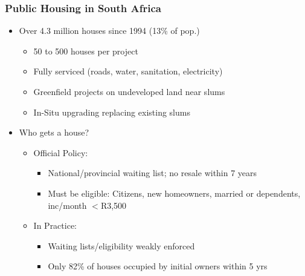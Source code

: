 \documentclass[aspectratio=149]{beamer}
\begin{document}
\begin{frame}
\frametitle{Public Housing in South Africa}
  \begin{itemize}
      \item Over 4.3 million houses since 1994 (13\% of pop.)
      \begin{itemize}
        \item 50 to 500 houses per project
        \item Fully serviced (roads, water, sanitation, electricity)
        \item Greenfield projects on undeveloped land near slums
        \item In-Situ upgrading replacing existing slums
      \end{itemize}
  \end{itemize}


\begin{itemize}
        \item Who gets a house?
          \vspace{.1cm}
      \begin{itemize}
        \item Official Policy: 
          \begin{itemize}
            \item National/provincial waiting list; no resale within 7 years
            \item Must be eligible: Citizens, new homeowners, married or dependents, inc/month $<$R3,500
          \end{itemize}
          \vspace{.1cm}
        \item In Practice:
          \begin{itemize}
            \item Waiting lists/eligibility weakly enforced
            \item Only 82\% of houses occupied by initial owners within 5 yrs
          \end{itemize}
      \end{itemize}
\end{itemize}

\end{frame}
\end{document}
